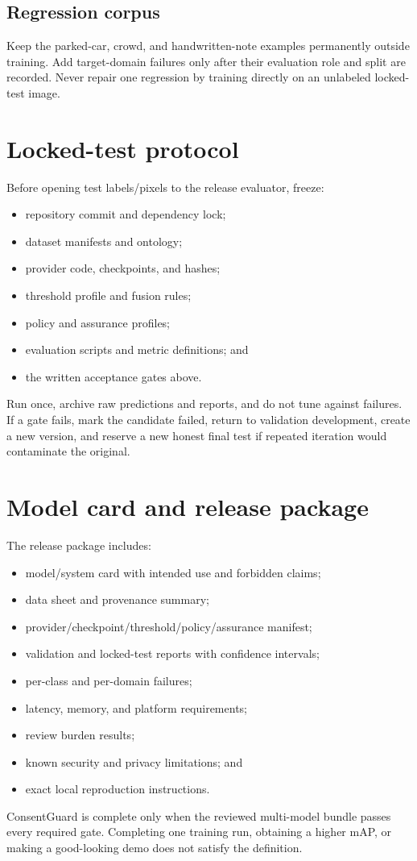\subsection{Regression corpus}

Keep the parked-car, crowd, and handwritten-note examples permanently outside training. Add target-domain failures only after their evaluation role and split are recorded. Never repair one regression by training directly on an unlabeled locked-test image.

\section{Locked-test protocol}

Before opening test labels/pixels to the release evaluator, freeze:

\begin{itemize}[leftmargin=6mm]
  \item repository commit and dependency lock;
  \item dataset manifests and ontology;
  \item provider code, checkpoints, and hashes;
  \item threshold profile and fusion rules;
  \item policy and assurance profiles;
  \item evaluation scripts and metric definitions; and
  \item the written acceptance gates above.
\end{itemize}

Run once, archive raw predictions and reports, and do not tune against failures. If a gate fails, mark the candidate failed, return to validation development, create a new version, and reserve a new honest final test if repeated iteration would contaminate the original.

\section{Model card and release package}

The release package includes:

\begin{itemize}[leftmargin=6mm]
  \item model/system card with intended use and forbidden claims;
  \item data sheet and provenance summary;
  \item provider/checkpoint/threshold/policy/assurance manifest;
  \item validation and locked-test reports with confidence intervals;
  \item per-class and per-domain failures;
  \item latency, memory, and platform requirements;
  \item review burden results;
  \item known security and privacy limitations; and
  \item exact local reproduction instructions.
\end{itemize}

\begin{warningbox}
ConsentGuard is complete only when the reviewed multi-model bundle passes every required gate. Completing one training run, obtaining a higher mAP, or making a good-looking demo does not satisfy the definition.
\end{warningbox}
